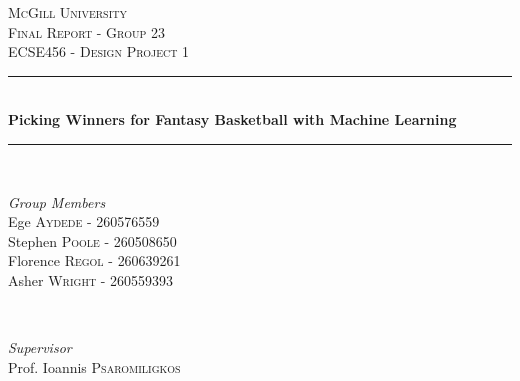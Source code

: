 \documentclass[11pt]{article}
\begin{document}
\begin{titlepage} %
	\newcommand{\HRule}{\rule{\linewidth}{0.5mm}} %
	
	\center %
	
	
	\textsc{\LARGE McGill University}\\[1.5cm] %
	
	\textsc{\Large Final Report - Group 23}\\[0.5cm] %
	
	\textsc{\large ECSE456 - Design Project 1}\\[0.5cm] %
	
	
	\HRule\\[0.4cm]
	
	{\huge\bfseries Picking Winners for Fantasy Basketball with Machine Learning}\\[0.4cm] %
	
	\HRule\\[1.5cm]
	
	
	\begin{minipage}{0.5\textwidth}
		\begin{flushleft}
			\large
			\textit{Group Members}\\
			Ege \textsc{Aydede} - {\small 260576559}\\
			Stephen \textsc{Poole} - {\small 260508650}\\
			Florence \textsc{Regol} - {\small 260639261}\\
			Asher \textsc{Wright} - {\small 260559393}
		\end{flushleft}
	\end{minipage}
	~
	\begin{minipage}{0.4\textwidth}
		\begin{flushright}
			\large
			\textit{Supervisor}\\
			Prof. Ioannis \textsc{Psaromiligkos} 
		\end{flushright}
	\end{minipage}
	


\end{titlepage}
\end{document}

